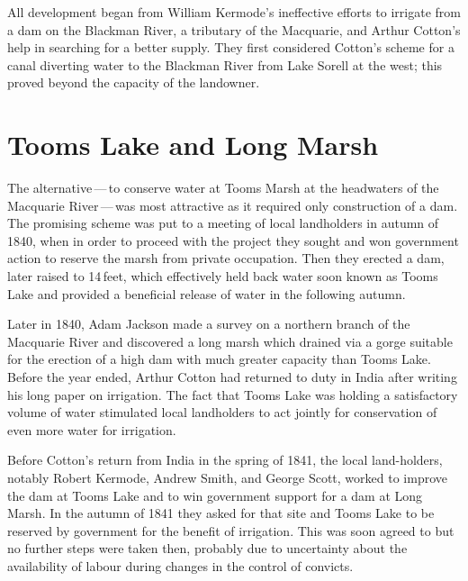 All development began from William Kermode's
ineffective efforts to irrigate from a dam on the Blackman River, a
tributary of the Macquarie, and Arthur Cotton's help in searching for
a better supply.  They first considered Cotton's scheme for a canal
diverting water to the Blackman River from Lake
Sorell at the west; this proved beyond the capacity
of the landowner.

\section*{Tooms Lake and Long Marsh}

The alternative\,---\,to conserve water at Tooms Marsh at the
headwaters of the Macquarie River\,---\,was
most attractive as it required only construction of a dam.  The
promising scheme was put to a meeting of local landholders in autumn
of 1840, when in order to proceed with the project they sought and won
government action to reserve the marsh from private occupation.  Then
they erected a dam, later raised to 14\,feet, which effectively held
back water soon known as Tooms Lake and provided a beneficial release
of water in the following autumn.

Later in 1840, Adam Jackson  made a survey on a
northern branch of the Macquarie River and discovered a long marsh
which drained via a gorge suitable for the erection of a high dam with
much greater capacity than Tooms Lake.  Before the year ended, Arthur
Cotton  had returned to duty in India after writing
his long paper on irrigation.  The fact that Tooms Lake was holding a
satisfactory volume of water stimulated local landholders to act
jointly for conservation of even more water for irrigation.

Before Cotton's return from India in the spring of 1841, the local
land-holders, notably Robert Kermode,  Andrew
Smith,  and George Scott,  worked to
improve the dam at Tooms Lake and to win government support for a dam
at Long Marsh.  In the autumn of 1841 they asked for that site and
Tooms Lake to be reserved by government for the benefit of irrigation.
This was soon agreed to but no further steps were taken then, probably
due to uncertainty about the availability of labour during changes in
the control of convicts.

